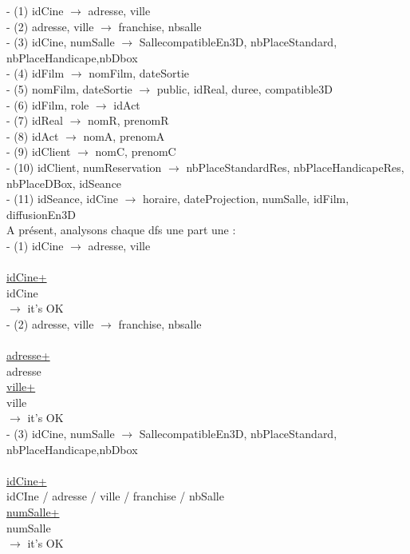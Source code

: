 \documentclass[a4paper,sffamily,12pt]{article}
\begin{document}
				\noindent- (1) idCine $\rightarrow$ adresse, ville \\
				- (2) adresse, ville $\rightarrow$ franchise, nbsalle \\
				- (3) idCine, numSalle $\rightarrow$ SallecompatibleEn3D, nbPlaceStandard, nbPlaceHandicape,nbDbox \\
		 		- (4) idFilm $\rightarrow$ nomFilm, dateSortie \\
				- (5) nomFilm, dateSortie $\rightarrow$ public, idReal, duree, compatible3D \\
				- (6) idFilm, role $\rightarrow$  idAct \\
				- (7) idReal $\rightarrow$ nomR, prenomR \\
				- (8) idAct $\rightarrow$ nomA, prenomA \\
				- (9) idClient $\rightarrow$ nomC, prenomC \\
				- (10) idClient, numReservation $\rightarrow$ nbPlaceStandardRes, nbPlaceHandicapeRes, nbPlaceDBox, idSeance \\
				- (11) idSeance, idCine $\rightarrow$ horaire, dateProjection, numSalle, idFilm, diffusionEn3D \\
				
				\noindent A présent, analysons chaque dfs une part une : \\
				
				\noindent - (1) idCine $\rightarrow$ adresse, ville \\
					\\
					\underline{idCine+} \\
					idCine\\									
				$\rightarrow$ it's OK \\		
					
				\noindent - (2) adresse, ville $\rightarrow$ franchise, nbsalle \\
					\\
					\underline{adresse+} \\
					adresse\\
					\underline{ville+} \\
					ville \\									
				$\rightarrow$ it's OK \\
				
				\noindent - (3) idCine, numSalle $\rightarrow$ SallecompatibleEn3D, nbPlaceStandard, nbPlaceHandicape,nbDbox \\
					\\
					\underline{idCine+} \\
					idCIne / adresse / ville / franchise / nbSalle\\
					\underline{numSalle+} \\
					numSalle \\								
				$\rightarrow$ it's OK \\													
\end{document}

